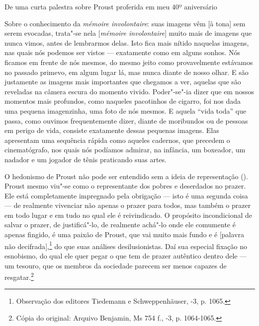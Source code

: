 De uma curta palestra sobre Proust proferida em meu 40º aniversário

Sobre o conhecimento da \emph{mémoire involontaire}: suas imagens vêm
{[}à tona{]} sem serem evocadas, trata"-se nela {[}\emph{mémoire
involontaire}{]} muito mais de imagens que nunca vimos, antes de
lembrarmos delas. Isto fica mais nítido naquelas imagens, nas quais nós
podemos ser vistos --- exatamente como em alguns sonhos. Nós ficamos em
frente de nós mesmos, do mesmo jeito como provavelmente estávamos no
passado primevo, em algum lugar lá, mas nunca diante de nosso olhar. E
são justamente as imagens mais importantes que chegamos a ver, aquelas
que são reveladas na câmera escura do momento vivido. Poder"-se"-ia dizer
que em nossos momentos mais profundos, como naqueles pacotinhos de
cigarro, foi nos dada uma pequena imagenzinha, uma foto de nós mesmos. E
aquela ``vida toda'' que passa, como ouvimos frequentemente dizer,
diante de moribundos ou de pessoas em perigo de vida, consiste
exatamente dessas pequenas imagens. Elas apresentam uma sequência rápida
como aqueles cadernos, que precedem o cinematógrafo, nos quais nós
podíamos admirar, na infância, um boxeador, um nadador e um jogador de
tênis praticando suas artes.

O hedonismo de Proust não pode ser entendido sem a ideia de
representação (). Proust mesmo viu"-se como o representante dos pobres e
deserdados no prazer. Ele está completamente impregnado pela obrigação
--- isto é uma segunda coisa --- de realmente vivenciar não apenas o
prazer para todos, mas também o prazer em todo lugar e em tudo no qual
ele é reivindicado. O propósito incondicional de salvar o prazer, de
justificá"-lo, de realmente achá"-lo onde ele comumente é apenas fingido,
é uma paixão de Proust, que vai muito mais fundo e é {[}palavra não
decifrada{]},\footnote{Observação dos editores Tiedemann e
  Schweppenhäuser, -3, p. 1065. \versal{[N. E.]}} do que suas análises
desilusionistas. Daí sua especial fixação no esnobismo, do qual ele quer
pegar o que tem de prazer autêntico dentro dele --- um tesouro, que os
membros da sociedade parecem ser menos capazes de resgatar.\footnote{Cópia do original: Arquivo Benjamin, Ms 754 f., -3, p. 1064-1065.}
